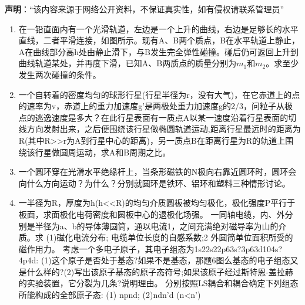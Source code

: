 
\textbf{声明}：“该内容来源于网络公开资料，不保证真实性，如有侵权请联系管理员”
\begin{enumerate}
$h$的岸上有人用绳索拉船靠岸。人以匀速率$v$拉绳，求当船离岸的距离为$s$的时候，船的速度和加速度。
\item 在一铅直面内有一个光滑轨道，左边是一个上升的曲线，右边是足够长的水平直线，二者平滑连接，如图所示。现有A、B两个质点，B在水平轨道上静止，A在曲线部分高h处由静止滑下，与B发生完全弹性碰撞。碰后仍可返回上升到曲线轨道某处，并再度下滑，已知A、B两质点的质量分别为$m_1$和$m_2$。求至少发生两次碰撞的条件。
\item 一个自转着的密度均匀的球形行星(行星半径为r，没有大气)，在它赤道上的点的速率为v，赤道上的重力加速度g'是两极处重力加速度g的2/3，问粒子从极点的逃逸速度是多大？在此行星表面有一质点A以某一速度沿着行星表面的切线方向发射出来，之后便围绕该行星做椭圆轨道运动,距离行星最远时的距离为R(其中R>>r为A到行星中心的距离)，另一质点B在距离行星为R的轨道上围绕该行星做圆周运动，求A和B周期之比。
\item 一个圆环穿在光滑水平绝缘杆上，当条形磁铁的N极向右靠近圆环时，圆环会向什么方向运动？为什么？分别就圆环是铁环、铝环和塑料三种情形讨论。
\item 一半径为R，厚度为h(h<<R)的均匀介质圆板被均匀极化，极化强度P平行于板面，求面极化电荷密度和圆板中心的退极化场强。
一同轴电缆，内、外分别是半径为a、b的导体薄圆筒，通以电流1，之间充满绝对磁导率为山的介质。求
(1)磁化电流分布;
电缆单位长度的自感系数;2
外圆简单位面积所受的磁作用力。
考虑一个多电子原子，其电子组态为1s22s22p63s?3p63d104s?4p4d:
(1)这个原子是否处于基态?如果不是基态，那题6图么基态的电子组态又是什么样的?(2)写出该原子基态的原子态符号;如果该原子经过斯特恩-盖拉赫的实验装置，它分裂为几条?说明理由。
分别按照LS耦合和耦合确定下列组态所能构成的全部原子态:
(1) npnd;
(2)ndn'd (n<n')
\end{enumerate}